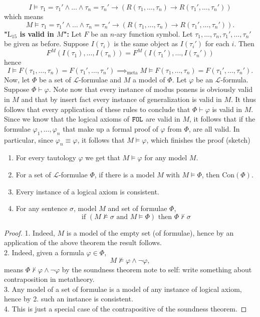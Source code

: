 \begin{proofsketch}
    $$I \vDash \tau_1 = \tau_1'\wedge \dots \wedge \tau_n=\tau_n' \to (R(\tau_1,\dots,\tau_n)\to R(\tau_1',\dots,\tau_n'))$$
    which means 
    $$M\vDash \tau_1 = \tau_1'\wedge \dots \wedge \tau_n=\tau_n' \to (R(\tau_1,\dots,\tau_n)\to R(\tau_1',\dots,\tau_n')).$$
    \textbf{"$\mathrm{L}_{15}$ is valid in $M$":} Let $F$ be an $n$-ary function symbol. Let $\tau_1,\dots,\tau_n,\tau_1',\dots,\tau_n'$ be given as before. Suppose $I(\tau_i)$ is the same object as $I(\tau_i')$ for each $i$. Then 
    $$F^M(I(\tau_1),\dots,I(\tau_n)) = F^{M}(I(\tau_1'),\dots,I(\tau_n'))$$
    hence 
    $$I\vDash F(\tau_1,\dots,\tau_n) = F(\tau_1',\dots,\tau_n') \implies_{\mathrm{meta}} M \vDash F(\tau_1,\dots,\tau_n) = F(\tau_1',\dots,\tau_n').$$
    Now, let $\Phi$ be a set of $\mathcal{L}$-formulae and $M$ a model of $\Phi$. Let $\varphi$ be an $\mathcal{L}$-formula. Suppose $\Phi\vdash \varphi$. Note now that every instance of modus ponens is obviously valid in $M$ and that by {\large insert fact} every instance of generalization is valid in $M$. It thus follows that every application of these rules to conclude that $\Phi\vdash \varphi$ is valid in $M$. Since we know that the logical axioms of $\verb|FOL|$ are valid in $M$, it follows that if the formulae $\varphi_1,\dots,\varphi_n$ that make up a formal proof of $\varphi$ from $\Phi$, are all valid. In particular, since $\varphi_n \equiv \varphi$, it follows that $M\vDash \varphi$, which finishes the proof (sketch) 
\end{proofsketch}
\begin{corollary}\label{ConsequencesOfSoundnessTheorem}
    \begin{enumerate}
        \item For every tautology $\varphi$ we get that $M\vDash \varphi$ for any model $M$.
        \item For a set of $\mathcal{L}$-formulae $\Phi$, if there is a model $M$ with $M\vDash \Phi$, then $\mathrm{Con}(\Phi)$.
        \item Every instance of a logical axiom is consistent.
        \item For any sentence $\sigma$, model $M$ and set of formulae $\Phi$,
        $$\text{if } (M\not\vDash \sigma \text{ and } M\vDash \Phi) \text{ then } \Phi\not\vdash \sigma$$ 
    \end{enumerate}
\end{corollary}
\begin{proof}
    1. Indeed, $M$ is a model of the empty set (of formulae), hence by an application of the above theorem the result follows.\\
    2. Indeed, given a formula $\varphi\in\Phi$, 
    $$M\not\vDash \varphi \wedge \neg\varphi,$$
    means $\Phi \not\vdash \varphi\wedge \neg\varphi$ by the soundness theorem {\large note to self: write something about contraposition in metatheory}.\\
    3. Any model of a set of formulae is a model of any instance of logical axiom, hence by 2. such an instance is consistent.\\
    4. This is just a special case of the contrapositive of the soundness theorem. 
\end{proof}
